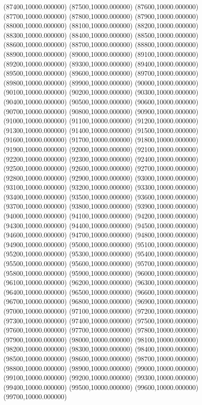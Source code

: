 (87400,10000.000000)
(87500,10000.000000)
(87600,10000.000000)
(87700,10000.000000)
(87800,10000.000000)
(87900,10000.000000)
(88000,10000.000000)
(88100,10000.000000)
(88200,10000.000000)
(88300,10000.000000)
(88400,10000.000000)
(88500,10000.000000)
(88600,10000.000000)
(88700,10000.000000)
(88800,10000.000000)
(88900,10000.000000)
(89000,10000.000000)
(89100,10000.000000)
(89200,10000.000000)
(89300,10000.000000)
(89400,10000.000000)
(89500,10000.000000)
(89600,10000.000000)
(89700,10000.000000)
(89800,10000.000000)
(89900,10000.000000)
(90000,10000.000000)
(90100,10000.000000)
(90200,10000.000000)
(90300,10000.000000)
(90400,10000.000000)
(90500,10000.000000)
(90600,10000.000000)
(90700,10000.000000)
(90800,10000.000000)
(90900,10000.000000)
(91000,10000.000000)
(91100,10000.000000)
(91200,10000.000000)
(91300,10000.000000)
(91400,10000.000000)
(91500,10000.000000)
(91600,10000.000000)
(91700,10000.000000)
(91800,10000.000000)
(91900,10000.000000)
(92000,10000.000000)
(92100,10000.000000)
(92200,10000.000000)
(92300,10000.000000)
(92400,10000.000000)
(92500,10000.000000)
(92600,10000.000000)
(92700,10000.000000)
(92800,10000.000000)
(92900,10000.000000)
(93000,10000.000000)
(93100,10000.000000)
(93200,10000.000000)
(93300,10000.000000)
(93400,10000.000000)
(93500,10000.000000)
(93600,10000.000000)
(93700,10000.000000)
(93800,10000.000000)
(93900,10000.000000)
(94000,10000.000000)
(94100,10000.000000)
(94200,10000.000000)
(94300,10000.000000)
(94400,10000.000000)
(94500,10000.000000)
(94600,10000.000000)
(94700,10000.000000)
(94800,10000.000000)
(94900,10000.000000)
(95000,10000.000000)
(95100,10000.000000)
(95200,10000.000000)
(95300,10000.000000)
(95400,10000.000000)
(95500,10000.000000)
(95600,10000.000000)
(95700,10000.000000)
(95800,10000.000000)
(95900,10000.000000)
(96000,10000.000000)
(96100,10000.000000)
(96200,10000.000000)
(96300,10000.000000)
(96400,10000.000000)
(96500,10000.000000)
(96600,10000.000000)
(96700,10000.000000)
(96800,10000.000000)
(96900,10000.000000)
(97000,10000.000000)
(97100,10000.000000)
(97200,10000.000000)
(97300,10000.000000)
(97400,10000.000000)
(97500,10000.000000)
(97600,10000.000000)
(97700,10000.000000)
(97800,10000.000000)
(97900,10000.000000)
(98000,10000.000000)
(98100,10000.000000)
(98200,10000.000000)
(98300,10000.000000)
(98400,10000.000000)
(98500,10000.000000)
(98600,10000.000000)
(98700,10000.000000)
(98800,10000.000000)
(98900,10000.000000)
(99000,10000.000000)
(99100,10000.000000)
(99200,10000.000000)
(99300,10000.000000)
(99400,10000.000000)
(99500,10000.000000)
(99600,10000.000000)
(99700,10000.000000)
